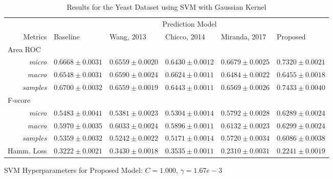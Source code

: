 \begin{table}[!ht]
    \footnotesize
    \centering
    \caption{Results for the Yeast Dataset using SVM with Gaussian Kernel}
    \label{results:yeast_svm}
    \begin{threeparttable}
    \begin{tabular}{@{}rrlllll@{}}
    \toprule
    && \multicolumn{5}{c}{Prediction Model} \\ \cmidrule{3-7}
    \multicolumn{2}{r}{Metrics}               & Baseline                & Wang, 2013 & Chicco, 2014 & Miranda, 2017 & Proposed            \\ \midrule
\multicolumn{2}{l}{Area ROC} \\
                    & \textit{micro}            & $0.6668 \pm 0.0031$ & $0.6559 \pm 0.0020$ & $0.6430 \pm 0.0012$ & $0.6679 \pm 0.0025$ & $\mathbf{0.7320 \pm 0.0021} $ \\
                     & \textit{macro}            & $0.6548 \pm 0.0031$ & $0.6590 \pm 0.0024$ & $\mathbf{0.6624 \pm 0.0011}$ & $0.6484 \pm 0.0022$ & $0.6455 \pm 0.0018 $ \\
                     & \textit{samples}            & $0.6700 \pm 0.0032$ & $0.6559 \pm 0.0019$ & $0.6443 \pm 0.0011$ & $0.6569 \pm 0.0026$ & $\mathbf{0.7433 \pm 0.0040} $ \\
\multicolumn{2}{l}{F-score} \\
                    & \textit{micro}            & $0.5483 \pm 0.0041$ & $0.5381 \pm 0.0023$ & $0.5304 \pm 0.0014$ & $0.5792 \pm 0.0028$ & $\mathbf{0.6289 \pm 0.0024} $ \\
                     & \textit{macro}            & $0.5970 \pm 0.0035$ & $0.6033 \pm 0.0024$ & $0.5896 \pm 0.0011$ & $0.6132 \pm 0.0023$ & $\mathbf{0.6299 \pm 0.0024} $ \\
                     & \textit{samples}            & $0.5359 \pm 0.0032$ & $0.5242 \pm 0.0022$ & $0.5171 \pm 0.0014$ & $0.5720 \pm 0.0034$ & $\mathbf{0.6086 \pm 0.0038} $ \\ 
\multicolumn{2}{l}{Hamm. Loss}            & $0.3222 \pm 0.0021$ & $0.3430 \pm 0.0018$ & $0.3535 \pm 0.0011$ & $0.2310 \pm 0.0031$ & $\mathbf{0.2241 \pm 0.0019}$ \\
\bottomrule
    \end{tabular}
    \begin{tablenotes}
        \item SVM Hyperparameters for Proposed Model: $C=1.000$, $\gamma=1.67e-3$
    \end{tablenotes}
    \end{threeparttable}
\end{table}
